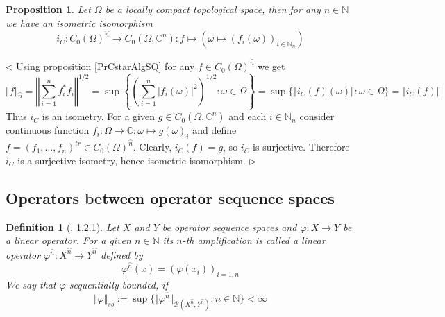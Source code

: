 \documentclass[12pt]{article}
\newtheorem{proposition}[theorem]{Proposition}
\newtheorem{definition}[theorem]{Definition}
\newenvironment{proof}{\par $\triangleleft$}{$\triangleright$}
\begin{document}
\begin{proposition}\label{PrCommCstarSQ} Let $\Omega$ be a locally compact topological space, then for any $n\in\mathbb{N}$ we have an isometric isomorphism
$$
i_C:C_0(\Omega)^{\wideparen{n}}\to C_0(\Omega,\mathbb{C}^n):f\mapsto (\omega\mapsto(f_i(\omega))_{i\in\mathbb{N}_n})
$$
\end{proposition} 
\begin{proof} Using proposition \ref{PrCstarAlgSQ} for any $f\in C_0(\Omega)^{\wideparen{n}}$ we get
$$
\Vert f\Vert_{\wideparen{n}}
=\left\Vert \sum\limits_{i=1}^n f_i^* f_i\right\Vert^{1/2}
=\sup\left\{\left(\sum\limits_{i=1}^n |f_i(\omega)|^2\right)^{1/2}:\omega\in\Omega\right\}
=\sup\{\Vert i_C(f)(\omega)\Vert:\omega\in\Omega\}
=\Vert i_C(f)\Vert
$$
Thus $i_C$ is an isometry. For a given $g\in C_0(\Omega,\mathbb{C}^n)$ and each $i\in\mathbb{N}_n$ consider continuous function $f_i:\Omega\to\mathbb{C}:\omega\mapsto g(\omega)_i$ and define $f=(f_1,\ldots,f_n)^{tr}\in C_0(\Omega)^{\wideparen{n}}$. Clearly, $i_C(f)=g$, so $i_C$ is surjective. Therefore $i_C$ is a surjective isometry, hence isometric isomorphism.
\end{proof}

































\subsection{Operators between operator sequence spaces}

\begin{definition}[\cite{LamOpFolgen}, 1.2.1]\label{DefSBOp}
Let $X$ and $Y$ be operator sequence spaces and $\varphi : X \to Y$ be a linear operator. For a given $n\in\mathbb{N}$ its $n$-th \textit{amplification} is called a linear operator $\varphi^{\wideparen{n}} : X^{\wideparen{n}} \to Y^{\wideparen{n}}$ 
defined by 
$$
\varphi^{\wideparen{n}}(x)=(\varphi(x_i))_{i=1,n}
$$
We say that $\varphi$ \textit{sequentially bounded}, if 
$$
\Vert \varphi \Vert_{sb} := \sup\{\Vert \varphi^{\wideparen{n}}\Vert_{\mathcal{B}(X^{\wideparen{n}},Y^{\wideparen{n}})}:n\in\mathbb{N}\}  < \infty
$$
\end{definition}
\end{document}
